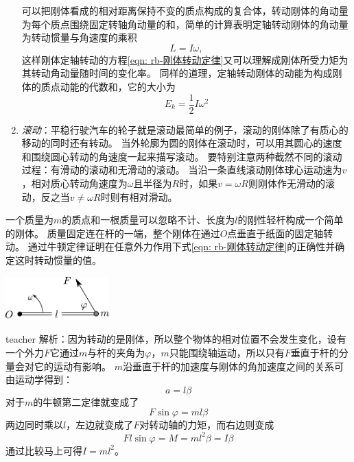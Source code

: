 \begin{enumerate}
可以把刚体看成的相对距离保持不变的质点构成的复合体，转动刚体的角动量为每个质点围绕固定转轴角动量的和，简单的计算表明定轴转动刚体的角动量为转动惯量与角速度的乘积
\begin{equation}
L = I\omega,
\end{equation}
这样刚体定轴转动的方程\ref{eqn: rb-刚体转动定律}又可以理解成刚体所受力矩为其转动角动量随时间的变化率。
同样的道理，定轴转动刚体的动能为构成刚体的质点动能的代数和，它的大小为
\begin{equation}
E_k = \frac{1}{2}I\omega^2
\end{equation}

\item \emph{滚动}：平稳行驶汽车的轮子就是滚动最简单的例子，滚动的刚体除了有质心的移动的同时还有转动。
当外轮廓为圆的刚体在滚动时，可以用其圆心的速度和围绕圆心转动的角速度一起来描写滚动。
要特别注意两种截然不同的滚动过程：有滑动的滚动和无滑动的滚动。
当沿一条直线滚动刚体球心运动速为$v$，相对质心转动角速度为$\omega$且半径为$R$时，如果$v = \omega R$则刚体作无滑动的滚动，反之当$v\neq \omega R$时则有相对滑动。


\end{enumerate}


\begin{example}
一个质量为$m$的质点和一根质量可以忽略不计、长度为$l$的刚性轻杆构成一个简单的刚体。
质量固定连在杆的一端，整个刚体在通过$O$点垂直于纸面的固定轴转动。
通过牛顿定律证明在任意外力作用下式\ref{eqn: rb-刚体转动定律}的正确性并确定这时转动惯量的值。
\begin{flushright}
\includegraphics[width = 0.3\textwidth]{images/rb-1.pdf} 
\end{flushright}
\begin{taggedblock}{teacher}
\noindent
解析：因为转动的是刚体，所以整个物体的相对位置不会发生变化，设有一个外力$F$它通过$m$与杆的夹角为$\varphi$，$m$只能围绕轴运动，所以只有$F$垂直于杆的分量会对它的运动有影响。
$m$沿垂直于杆的加速度与刚体的角加速度之间的关系可由运动学得到：
\[a = l\beta\]
对于$m$的牛顿第二定律就变成了
\[
F\sin\varphi = ml\beta
\]
两边同时乘以$l$，左边就变成了$F$对转动轴的力矩，而右边则变成
\[ Fl\sin\varphi = M = ml^2\beta = I\beta\]
通过比较马上可得$I=ml^2$。
\end{taggedblock}
\end{example}




